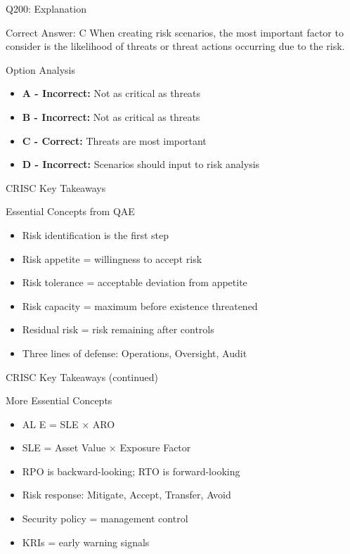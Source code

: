 \documentclass{beamer}
\begin{document}
	\begin{frame}{Q200: Explanation}
		\begin{block}{Correct Answer: C}
			When creating risk scenarios, the most important factor to consider is the likelihood of threats or threat actions occurring due to the risk.
		\end{block}
		\begin{block}{Option Analysis}
			\begin{itemize}
				\item \textbf{A - Incorrect:} Not as critical as threats
				\item \textbf{B - Incorrect:} Not as critical as threats
				\item \textbf{C - Correct:} Threats are most important
				\item \textbf{D - Incorrect:} Scenarios should input to risk analysis
			\end{itemize}
		\end{block}
	\end{frame}
	
	
	\begin{frame}{CRISC Key Takeaways}
		\begin{block}{Essential Concepts from QAE}
			\begin{itemize}
				\item Risk identification is the first step
				\item Risk appetite = willingness to accept risk
				\item Risk tolerance = acceptable deviation from appetite
				\item Risk capacity = maximum before existence threatened
				\item Residual risk = risk remaining after controls
				\item Three lines of defense: Operations, Oversight, Audit
			\end{itemize}
		\end{block}
	\end{frame}
	
	\begin{frame}{CRISC Key Takeaways (continued)}
		\begin{block}{More Essential Concepts}
			\begin{itemize}
				\item AL E = SLE × ARO
				\item SLE = Asset Value × Exposure Factor
				\item RPO is backward-looking; RTO is forward-looking
				\item Risk response: Mitigate, Accept, Transfer, Avoid
				\item Security policy = management control
				\item KRIs = early warning signals
			\end{itemize}
		\end{block}
	\end{frame}
	
\end{document}
